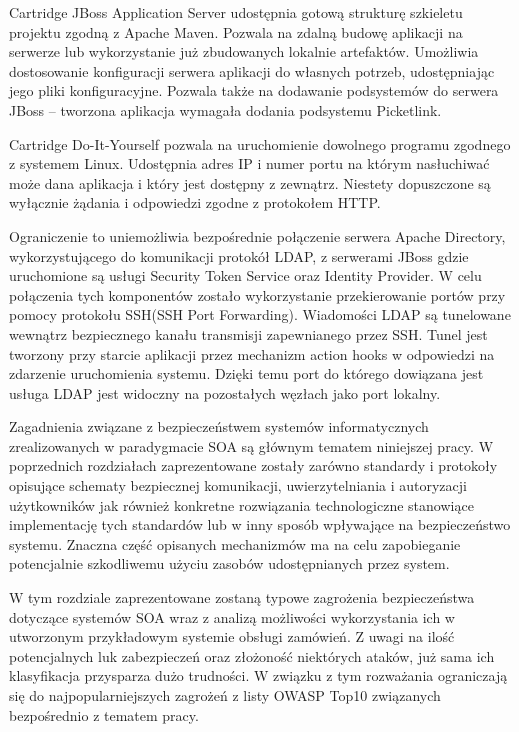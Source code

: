 	Cartridge JBoss Application Server udostępnia gotową strukturę szkieletu projektu zgodną z Apache Maven. Pozwala na zdalną budowę aplikacji na serwerze lub wykorzystanie już zbudowanych lokalnie artefaktów. Umożliwia dostosowanie konfiguracji serwera aplikacji do własnych potrzeb, udostępniając jego pliki konfiguracyjne. Pozwala także na dodawanie podsystemów do serwera JBoss – tworzona aplikacja wymagała dodania podsystemu Picketlink.
	

	Cartridge Do-It-Yourself pozwala na uruchomienie dowolnego programu zgodnego z systemem Linux. Udostępnia adres IP i numer portu na którym nasłuchiwać może dana aplikacja i który jest dostępny z zewnątrz. Niestety dopuszczone są wyłącznie żądania i odpowiedzi zgodne z protokołem HTTP. 
	
	Ograniczenie to uniemożliwia bezpośrednie połączenie serwera Apache Directory, wykorzystującego do komunikacji protokół LDAP,  z serwerami JBoss gdzie uruchomione są usługi Security Token Service oraz Identity Provider. W celu połączenia tych komponentów zostało wykorzystanie przekierowanie portów przy pomocy protokołu SSH(SSH Port Forwarding). Wiadomości LDAP są tunelowane wewnątrz bezpiecznego kanału transmisji zapewnianego przez SSH. Tunel jest tworzony przy starcie aplikacji przez mechanizm action hooks w odpowiedzi na zdarzenie uruchomienia systemu.  Dzięki temu port do którego dowiązana jest usługa LDAP jest widoczny na pozostałych węzłach jako port lokalny. 



	Zagadnienia związane z bezpieczeństwem systemów informatycznych zrealizowanych w paradygmacie SOA są głównym tematem niniejszej pracy.  W poprzednich rozdziałach zaprezentowane zostały zarówno standardy i protokoły opisujące schematy bezpiecznej komunikacji, uwierzytelniania i autoryzacji użytkowników jak również konkretne rozwiązania technologiczne  stanowiące implementację tych standardów lub w inny sposób wpływające na bezpieczeństwo systemu. Znaczna część opisanych mechanizmów ma na celu zapobieganie potencjalnie szkodliwemu użyciu zasobów udostępnianych przez system. 
	
	W tym rozdziale zaprezentowane zostaną typowe zagrożenia bezpieczeństwa dotyczące systemów SOA wraz z analizą możliwości wykorzystania ich w utworzonym przykładowym systemie obsługi zamówień. Z uwagi na ilość potencjalnych luk zabezpieczeń oraz złożoność niektórych ataków, już sama ich klasyfikacja  przysparza dużo trudności. W związku z tym rozważania ograniczają się do najpopularniejszych zagrożeń z listy OWASP Top10\cite{OWASP:2013}  związanych bezpośrednio z tematem pracy.

